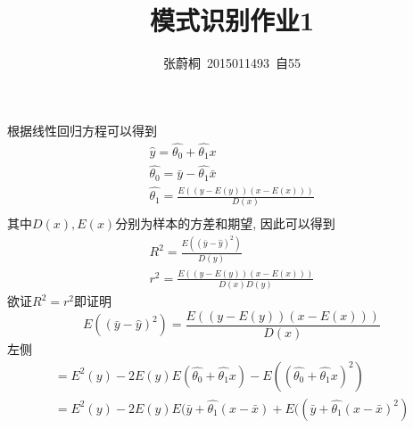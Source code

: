 \documentclass[UTF8,a4paper]{ctexart}
\title{模式识别作业1}
\author{张蔚桐\ 2015011493\ 自55}
\begin{document}
\maketitle
\section{}
根据线性回归方程可以得到$$\begin{aligned}
\hat{y}=\hat{\theta_0}+\hat{\theta_1}x \\ 
\hat{\theta_0}=\bar{y}-\hat{\theta_1}\bar{x} \\
\hat{\theta_1}=\frac{E((y-E(y))(x-E(x)))}{D(x)}\\
\end{aligned}$$其中$D(x),E(x)$分别为样本的方差和期望,
因此可以得到$$\begin{aligned}
R^2=\frac{E((\bar{y}-\hat{y})^2)}{D(y)} \\
r^2=\frac{E((y-E(y))(x-E(x)))}{D(x)D(y)} \end{aligned} $$
欲证$R^2=r^2$即证明$$E((\bar{y}-\hat{y})^2)=\frac{E((y-E(y))(x-E(x)))}{D(x)}$$
左侧$$\begin{aligned}=E^2(y)-2E(y)E(\hat{\theta_0}+\hat{\theta_1}x) - E((\hat{\theta_0}+\hat{\theta_1}x)^2)\\ =E^2(y)-2E(y)E(\bar{y}+\hat{\theta_1}(x-\bar{x})+E((\bar{y}+\hat{\theta_1}(x-\bar{x})^2)
\end{aligned}$$
\end{document}
